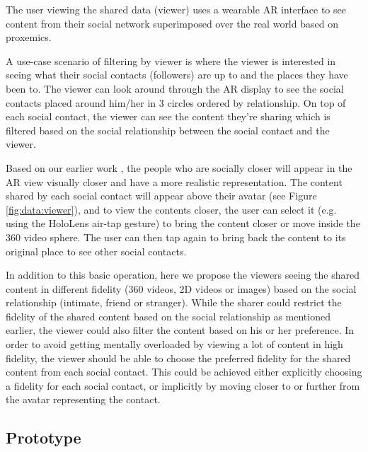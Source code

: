 The user viewing the shared data (viewer) uses a wearable AR interface to see content from their social network superimposed over the real world based on proxemics. 

A use-case scenario of filtering by viewer is where the viewer is interested in seeing what their social contacts (followers) are up to and the places they have been to. The viewer can look around through the AR display to see the social contacts placed around him/her in 3 circles ordered by relationship. On top of each social contact, the viewer can see the content they're sharing which is filtered based on the social relationship between the social contact and the viewer.

Based on our earlier work \cite{Nassani2017a}, the people who are socially closer will appear in the AR view visually closer and have a more realistic representation. The content shared by each social contact will appear above their avatar (see Figure \ref{fig:data:viewer}), and to view the contents closer, the user can select it (e.g. using the HoloLens air-tap gesture) to bring the content closer or move inside the 360 video sphere. The user can then tap again to bring back the content to its original place to see other social contacts. 

In addition to this basic operation, here we propose the viewers seeing the shared content in different fidelity (360 videos, 2D videos or images) based on the social relationship (intimate, friend or stranger). While the sharer could restrict the fidelity of the shared content based on the social relationship as mentioned earlier, the viewer could also filter the content based on his or her preference. In order to avoid getting mentally overloaded by viewing a lot of content in high fidelity, the viewer should be able to choose the preferred fidelity for the shared content from each social contact. This could be achieved either explicitly choosing a fidelity for each social contact, or implicitly by moving closer to or further from the avatar representing the contact.      

\subsection{Prototype}


